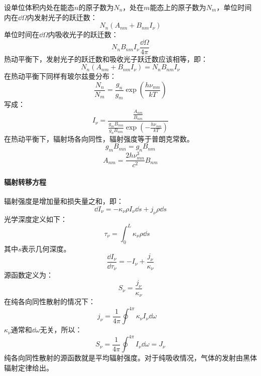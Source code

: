 设单位体积内处在能态$n$的原子数为$N_{n}$，处在$m$能态上的原子数为$N_{m}$，单位时间内在$\dd \Omega$内发射光子的跃迁数：
\begin{equation}
	N_{n}\left(A_{nm}+B_{nm}I_{\nu}\right)
\end{equation}
单位时间在$\dd \Omega$内吸收光子的跃迁数：
\begin{equation}
	N_{n}B_{nm}I_{\nu}\frac{\dd \Omega}{4\pi}
\end{equation}
热动平衡下，发射光子的跃迁数和吸收光子跃迁数应该相等，即：
\begin{equation}
	N_{n}\left(A_{nm}+B_{nm}I_{\nu}\right)=N_{n}B_{nm}I_{\nu}
\end{equation}
在热动平衡下同样有玻尔兹曼分布：
\begin{equation}
	\frac{N_{n}}{N_{m}}=\frac{g_{n}}{g_{m}}\exp(\frac{h\nu_{mn}}{kT})
\end{equation}
写成：
\begin{equation}
	I_{\nu}=\frac{\frac{A_{nm}}{B_{nm}}}{\frac{g_{m}B_{mn}}{g_{n}B_{nm}}\exp (-\frac{h\nu_{mn}}{kT})}
\end{equation}
在热动平衡下，辐射场各向同性，辐射强度等于普朗克常数。
\begin{equation}
	g_{m}B_{mn}=g_{n}B_{nm}
\end{equation}
\begin{equation}
	A_{nm}=\frac{2h\nu_{mn}^3}{c^2}B_{nm}
\end{equation}
\paragraph{辐射转移方程}
辐射强度是增加量和损失量之和，即：
\begin{equation}
	\dd I_{\nu}=-\kappa_{\nu}\rho I_{\nu}\dd s+j_{\nu}\rho\dd s
\end{equation}
光学深度定义如下：
\begin{equation}
	\tau_{\nu}=\int_{0}^{L}\kappa_{\nu}\rho\dd s\quad
\end{equation}
其中$s$表示几何深度。
\begin{equation}
	\frac{\dd I_{\nu}}{\dd \tau_{\nu}}=-I_{\nu}+\frac{j_{\nu}}{\kappa_{\nu}}
\end{equation}
源函数定义为：
\begin{equation}
	S_{\nu}=\frac{j_{\nu}}{\kappa_{\nu}}
\end{equation}
在纯各向同性散射的情况下：
\begin{equation}
	j_{\nu}=\frac{1}{4\pi}\oint^{4\pi}\kappa_{\nu}I_{\nu}\dd \omega \quad
\end{equation}
$\kappa_{\nu}$通常和$\dd \omega$无关，所以：
\begin{equation}
	S_{\nu}=\frac{1}{4\pi}\oint^{4\pi}I_{\nu}\dd \omega =J_{\nu}
\end{equation}
纯各向同性散射的源函数就是平均辐射强度。对于纯吸收情况，气体的发射由黑体辐射定律给出。

